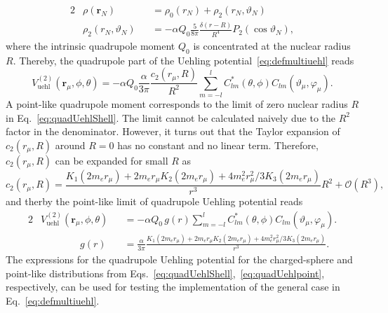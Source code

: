 \begin{alignat}{2}
&\rho(\mathbf{r}_N)&&=\rho_0(r_N) + \rho_2(r_N,\vartheta_N)\\
&\rho_2(r_N,\vartheta_N)&&=-\alpha Q_0 \frac{5}{8\pi }\frac{\delta(r-R)}{R^4}
P_2(\cos\vartheta_N),
\end{alignat}
where the intrinsic quadrupole moment $Q_0$ is concentrated at the nuclear radius $R$. Thereby, the quadrupole part of the Uehling potential~\eqref{eq:defmultiuehl} reads
\begin{equation}
V^{(2)}_{\text{uehl}}(\mathbf{r}_\mu,\phi,\theta)=
-\alpha Q_0 \frac{\alpha}{3\pi}\frac{c_2(r_\mu,R)}{R^2}\sum\limits_{m=-l}^{l} C_{lm}^*(\theta,\phi)C_{lm}(\vartheta_\mu,\varphi_\mu).
\label{eq:quadUehlShell}
\end{equation}
A point-like quadrupole moment corresponds to the limit of zero nuclear radius $R$ in Eq.~\eqref{eq:quadUehlShell}. The limit cannot be calculated naively due to the $R^{2}$ factor in the denominator. However, it turns out that the Taylor expansion of $c_2(r_\mu,R)$ around $R=0$ has no constant and no linear term. Therefore, $c_2(r_\mu,R)$ can be expanded for small $R$ as
\begin{equation}
c_2(r_\mu,R) = \frac{K_1(2m_er_\mu)+2m_er_\mu K_2(2m_er_\mu)+4m_e^2r_\mu^2/3K_3(2m_er_\mu)}{r^3}R^2 + \mathcal{O}(R^3),
\end{equation}
and therby the point-like limit of quadrupole Uehling potential reads
\begin{alignat}{2}
\label{eq:quadUehlpoint}
&V^{(2)}_{\text{uehl}}(\mathbf{r}_\mu,\phi,\theta)&&=
-\alpha Q_0\, g(r) \sum\limits_{m=-l}^{l} C_{lm}^*(\theta,\phi)C_{lm}(\vartheta_\mu,\varphi_\mu).\\
&\qquad\qquad g(r)&&=\frac{\alpha}{3\pi}\frac{K_1(2m_er_\mu)+2m_er_\mu K_2(2m_er_\mu)+4m_e^2r_\mu^2/3K_3(2m_er_\mu)}{r^3}.
\label{eq:quadUehlShellLimit}
\end{alignat}
The expressions for the quadrupole Uehling potential for the charged-sphere and point-like distributions from Eqs.~\eqref{eq:quadUehlShell},~\eqref{eq:quadUehlpoint}, respectively, can be used for testing the implementation of the general case in Eq.~\eqref{eq:defmultiuehl}.\\


